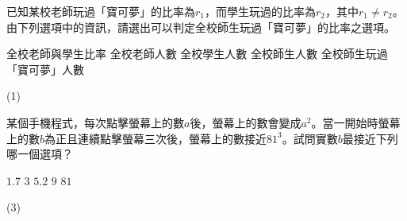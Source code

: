 \begin{QUESTIONS}
\begin{QUESTION}
    \begin{QBODY}
        已知某校老師玩過「寶可夢」的比率為${{r}_{1}}$，而學生玩過的比率為${{r}_{2}}$，其中${{r}_{1}}\ne {{r}_{2}}$。
        由下列選項中的資訊，請選出可以判定全校師生玩過「寶可夢」的比率之選項。
        \begin{QOPS}
            \QOP 全校老師與學生比率     
            \QOP 全校老師人數
            \QOP 全校學生人數
            \QOP 全校師生人數
            \QOP 全校師生玩過「寶可夢」人數
        \end{QOPS}
    \end{QBODY}
    \begin{QFROMS}
    \end{QFROMS}
    \begin{QTAGS}
    \end{QTAGS}
    \begin{QANS}
        (1)
    \end{QANS}
    \begin{QSOL}
    \end{QSOL}
    \begin{QEMPTYSPACE}
    \end{QEMPTYSPACE}
\end{QUESTION}
\begin{QUESTION}
    \begin{QBODY}
        某個手機程式，每次點擊螢幕上的數$a$後，螢幕上的數會變成${{a}^{2}}$。當一開始時螢幕上的數$b$為正且連續點擊螢幕三次後，螢幕上的數接近${{81}^{3}}$。試問實數$b$最接近下列哪一個選項？
        \begin{QOPS}
            \QOP $1.7$      
            \QOP $3$      
            \QOP $5.2$      
            \QOP $9$      
            \QOP $81$
        \end{QOPS}
    \end{QBODY}
    \begin{QFROMS}
    \end{QFROMS}
    \begin{QTAGS}
    \end{QTAGS}
    \begin{QANS}
        (3)
    \end{QANS}
    \begin{QSOL}
    \end{QSOL}
    \begin{QEMPTYSPACE}
    \end{QEMPTYSPACE}

\end{QUESTION}
\end{QUESTIONS}
